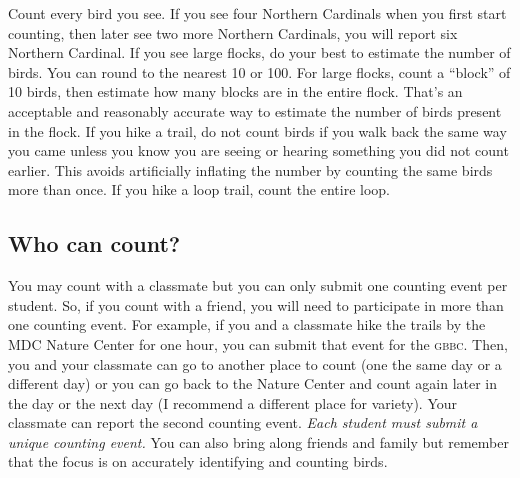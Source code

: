 \documentclass[11pt]{article}
\begin{document}
Count every bird you see. If you see four Northern Cardinals when you first start counting, then later see two more Northern Cardinals, you will report six Northern Cardinal. If you see large flocks, do your best to estimate the number of birds. You can round to the nearest 10 or 100. For large flocks, count a “block” of 10 birds, then estimate how many blocks are in the entire flock. That's an acceptable and reasonably accurate way to estimate the number of birds present in the flock. If you hike a trail, do not count birds if you walk back the same way you came unless you know you are seeing or hearing something you did not count earlier. This avoids artificially inflating the number by counting the same birds more than once.  If you hike a loop trail, count the entire loop.  

\subsection*{Who can count?}

You may count with a classmate but you can only submit one counting event per student. So, if you count with a friend, you will need to participate in more than one counting event. For example, if you and a classmate hike the trails by the MDC Nature Center for one hour,  you can submit that event for the \textsc{gbbc.} Then, you and your classmate can go to another place to count (one the same day or a different day) or you can go back to the Nature Center and count again later in the day or the next day (I recommend a different place for variety). Your classmate can report the second counting event.  \emph{Each student must submit a unique counting event.}  You can also bring along friends and family but remember that the focus is on accurately identifying and counting birds.
\end{document}
